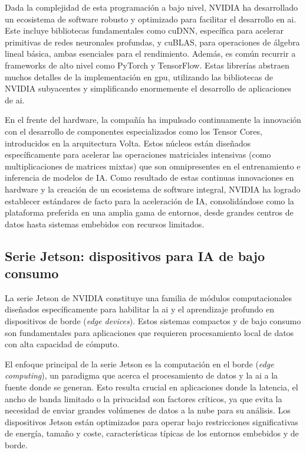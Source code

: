 \documentclass[11pt,spanish,listoffigures,listoftables]{tfgetsinf}
\begin{document}
Dada la complejidad de esta programación a bajo nivel, NVIDIA ha desarrollado un ecosistema de software robusto y optimizado para facilitar el desarrollo en \gls{ai}. Este incluye bibliotecas fundamentales como cuDNN, específica para acelerar primitivas de redes neuronales profundas, y cuBLAS, para operaciones de álgebra lineal básica, ambas esenciales para el rendimiento. Además, es común recurrir a frameworks de alto nivel como PyTorch y TensorFlow. Estas librerías abstraen muchos detalles de la implementación en \gls{gpu}, utilizando las bibliotecas de NVIDIA subyacentes y simplificando enormemente el desarrollo de aplicaciones de \gls{ai}.

En el frente del hardware, la compañía ha impulsado continuamente la innovación con el desarrollo de componentes especializados como los Tensor Cores, introducidos en la arquitectura Volta. Estos núcleos están diseñados específicamente para acelerar las operaciones matriciales intensivas (como multiplicaciones de matrices mixtas) que son omnipresentes en el entrenamiento e inferencia de modelos de IA. Como resultado de estas continuas innovaciones en hardware y la creación de un ecosistema de software integral, NVIDIA ha logrado establecer estándares de facto para la aceleración de IA, consolidándose como la plataforma preferida en una amplia gama de entornos, desde grandes centros de datos hasta sistemas embebidos con recursos limitados.


\subsection{Serie Jetson: dispositivos para IA de bajo consumo} \label{sec:jetson}
La serie Jetson de NVIDIA constituye una familia de módulos computacionales diseñados específicamente para habilitar la \gls{ai} y el aprendizaje profundo en dispositivos de borde (\textit{edge devices}). Estos sistemas compactos y de bajo consumo son fundamentales para aplicaciones que requieren procesamiento local de datos con alta capacidad de cómputo.

El enfoque principal de la serie Jetson es la computación en el borde (\textit{edge computing}), un paradigma que acerca el procesamiento de datos y la \gls{ai} a la fuente donde se generan. Esto resulta crucial en aplicaciones donde la latencia, el ancho de banda limitado o la privacidad son factores críticos, ya que evita la necesidad de enviar grandes volúmenes de datos a la nube para su análisis. Los dispositivos Jetson están optimizados para operar bajo restricciones significativas de energía, tamaño y coste, características típicas de los entornos embebidos y de borde.
\end{document}
